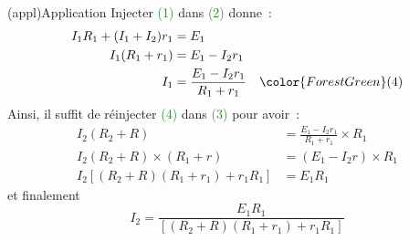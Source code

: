 \documentclass[../../main/main.tex]{subfiles}
\begin{document}
{\begin{center}
    \begin{tcb}[sidebyside, righthand ratio=.55](appl){Application}
        Injecter \textcolor{ForestGreen}{(1)} dans \textcolor{ForestGreen}{(2)}
        donne~:
        \begin{align*}
            I_1R_1 + (I_1+I_2)r_1 &= E_1\\
            I_1(R_1+r_1) &= E_1-I_2r_1\\
            I_1 &= \frac{E_1 - I_2r_1}{R_1 + r_1} \quad \color{ForestGreen}(4)
        \end{align*}
        Ainsi, il suffit de réinjecter \textcolor{ForestGreen}{(4)} dans
        \textcolor{ForestGreen}{(3)} pour avoir~:
        \tcblower
        \begin{align*}
            I_2(R_2+R) &= \frac{E_1 - I_2r_1}{R_1 + r_1}\times R_1\\
            I_2(R_2+R)\times(R_1+r) &= (E_1-I_2r)\times R_1\\
            I_2 \left[ (R_2+R)(R_1+r_1)+r_1R_1 \right] &= E_1R_1
        \end{align*}
        et finalement
        \[\boxed{I_2 = \frac{E_1R_1}{\left[ (R_2+R)(R_1+r_1)+r_1R_1 \right]}}\]
    \end{tcb}
\end{center}

}
\end{document}
